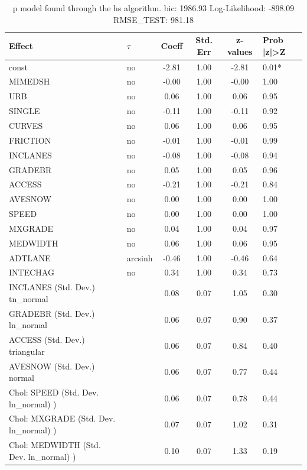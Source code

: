 \begin{table}
	\caption{p model found through the hs algorithm. bic: 1986.93 Log-Likelihood: -898.09 RMSE_TEST: 981.18}
	\begin{center}
		\begin{tabular}{|l|l|c|c|c|l|}
			\hline
			Effect & $\tau$ & Coeff & Std. Err & z-values & Prob |z|>Z \\
			\hline
			const & no & -2.81 & 1.00 & -2.81 & 0.01* \\
			\hline
			MIMEDSH & no & -0.00 & 1.00 & -0.00 & 1.00 \\
			\hline
			URB & no & 0.06 & 1.00 & 0.06 & 0.95 \\
			\hline
			SINGLE & no & -0.11 & 1.00 & -0.11 & 0.92 \\
			\hline
			CURVES & no & 0.06 & 1.00 & 0.06 & 0.95 \\
			\hline
			FRICTION & no & -0.01 & 1.00 & -0.01 & 0.99 \\
			\hline
			INCLANES & no & -0.08 & 1.00 & -0.08 & 0.94 \\
			\hline
			GRADEBR & no & 0.05 & 1.00 & 0.05 & 0.96 \\
			\hline
			ACCESS & no & -0.21 & 1.00 & -0.21 & 0.84 \\
			\hline
			AVESNOW & no & 0.00 & 1.00 & 0.00 & 1.00 \\
			\hline
			SPEED & no & 0.00 & 1.00 & 0.00 & 1.00 \\
			\hline
			MXGRADE & no & 0.04 & 1.00 & 0.04 & 0.97 \\
			\hline
			MEDWIDTH & no & 0.06 & 1.00 & 0.06 & 0.95 \\
			\hline
			ADTLANE & arcsinh & -0.46 & 1.00 & -0.46 & 0.64 \\
			\hline
			INTECHAG & no & 0.34 & 1.00 & 0.34 & 0.73 \\
			\hline
			INCLANES (Std. Dev.) tn_normal &  & 0.08 & 0.07 & 1.05 & 0.30 \\
			\hline
			GRADEBR (Std. Dev.) ln_normal &  & 0.06 & 0.07 & 0.90 & 0.37 \\
			\hline
			ACCESS (Std. Dev.) triangular &  & 0.06 & 0.07 & 0.84 & 0.40 \\
			\hline
			AVESNOW (Std. Dev.) normal &  & 0.06 & 0.07 & 0.77 & 0.44 \\
			\hline
			 Chol: SPEED (Std. Dev. ln_normal) ) &  & 0.06 & 0.07 & 0.78 & 0.44 \\
			\hline
			 Chol: MXGRADE (Std. Dev. ln_normal) ) &  & 0.07 & 0.07 & 1.02 & 0.31 \\
			\hline
			 Chol: MEDWIDTH (Std. Dev. ln_normal) ) &  & 0.10 & 0.07 & 1.33 & 0.19 \\

\end{tabular}
\end{center}
\end{table}
